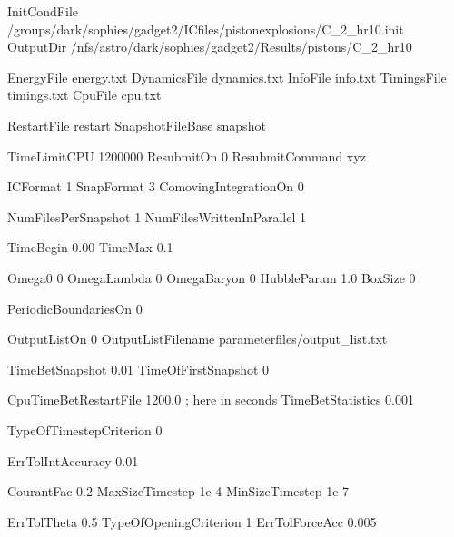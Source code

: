 
InitCondFile 	 /groups/dark/sophies/gadget2/ICfiles/pistonexplosions/C_2_hr10.init
OutputDir      	 /nfs/astro/dark/sophies/gadget2/Results/pistons/C_2_hr10

EnergyFile        energy.txt
DynamicsFile      dynamics.txt
InfoFile          info.txt
TimingsFile       timings.txt
CpuFile           cpu.txt

RestartFile       restart
SnapshotFileBase  snapshot





TimeLimitCPU      1200000       
ResubmitOn        0
ResubmitCommand   xyz



ICFormat                 1
SnapFormat               3
ComovingIntegrationOn    0

NumFilesPerSnapshot       1
NumFilesWrittenInParallel 1




TimeBegin           0.00
TimeMax	            0.1

Omega0	              0
OmegaLambda           0
OmegaBaryon           0
HubbleParam         1.0
BoxSize               0

PeriodicBoundariesOn     0


OutputListOn             0
OutputListFilename    parameterfiles/output_list.txt

TimeBetSnapshot        0.01
TimeOfFirstSnapshot    0

CpuTimeBetRestartFile     1200.0    ; here in seconds
TimeBetStatistics         0.001




	
TypeOfTimestepCriterion  0	

ErrTolIntAccuracy      0.01      %

CourantFac             0.2      %
MaxSizeTimestep        1e-4
MinSizeTimestep        1e-7




ErrTolTheta            0.5            
TypeOfOpeningCriterion 1
ErrTolForceAcc         0.005



